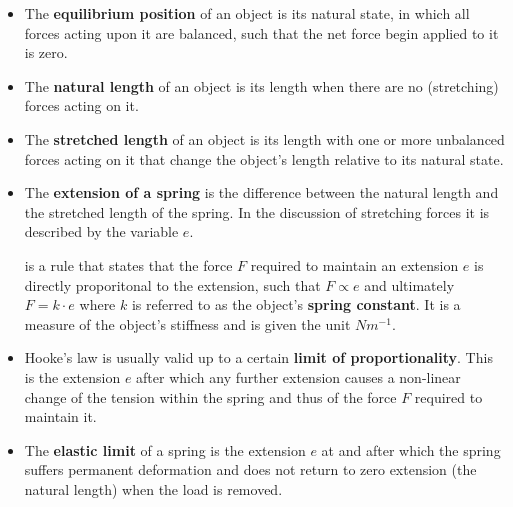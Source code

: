\begin{itemize}
	\item The \textbf{equilibrium position} of an object is its natural state, in which all forces acting upon it are balanced, such that the net force begin applied to it is zero.

	\item The \textbf{natural length} of an object is its length when there are no (stretching) forces acting on it. 

	\item The \textbf{stretched length} of an object is its length with one or more unbalanced forces acting on it that change the object's length relative to its natural state.

	\item The \textbf{extension of a spring} is the difference between the natural length and the stretched length of the spring. In the discussion of stretching forces it is described by the variable $e$.

	 is a rule that states that the force $F$ required to maintain an extension $e$ is directly proporitonal to the extension, such that $F \propto e$ and ultimately $F = k \cdot e$ where $k$ is referred to as the object's \textbf{spring constant}. It is a measure of the object's stiffness and is given the unit $N m^{-1}$.

	\item Hooke's law is usually valid up to a certain \textbf{limit of proportionality}. This is the extension $e$ after which any further extension causes a non-linear change of the tension within the spring and thus of the force $F$ required to maintain it.

	\item The \textbf{elastic limit} of a spring is the extension $e$ at and after which the spring suffers permanent deformation and does not return to zero extension (the natural length) when the load is removed.
\end{itemize}


